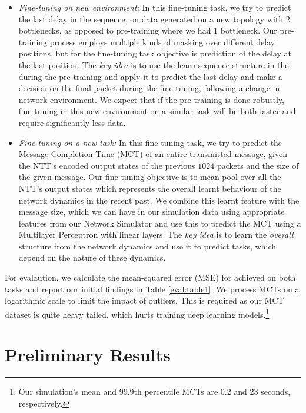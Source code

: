 \begin{itemize}
\item \emph{Fine-tuning on new environment:} In this fine-tuning task, we try to predict the last delay in the sequence, on data generated on a new topology with $2$ bottlenecks, as opposed to pre-training where we had $1$ bottleneck. Our pre-training process employs multiple kinds of masking over different delay positions, but for the fine-tuning task objective is prediction of the delay at the last position. The \emph{key idea} is to use the learn sequence structure in the during the pre-training and apply it to predict the last delay and make a decision on the final packet during the fine-tuning, following a change in network environment. We expect that if the pre-training is done robustly, fine-tuning in this new environment on a similar task will be both faster and require significantly less data.

\item \emph{Fine-tuning on a new task:} In this fine-tuning task, we try to predict the Message Completion Time (MCT) of an entire transmitted message, given the NTT's encoded output states of the previous $1024$ packets and the size of the given message. Our fine-tuning objective is to mean pool\cite{poolcv,zaheerDeepSets2018} over all the NTT's output states which represents the overall learnt behaviour of the network dynamics in the recent past. We combine this learnt feature with the message size, which we can have in our simulation data using appropriate features from our Network Simulator\cite{ns3} and use this to predict the MCT using a Multilayer Perceptron with linear layers. The \emph{key idea} is to learn the \emph{overall} structure from the network dynamics and use it to predict tasks, which depend on the nature of these dynamics.
\end{itemize}

For evalaution, we calculate the mean-squared error (MSE) for achieved on both tasks and report our initial findings in Table \ref{eval:table1}. We process MCTs on a logarithmic scale to limit the impact of outliers. This is required as our MCT dataset is quite heavy tailed, which hurts training deep learning models.\footnote{Our simulation's mean and 99.9th percentile MCTs are 0.2 and 23 seconds, respectively.}


\section{Preliminary Results}
\label{eval:pres}

